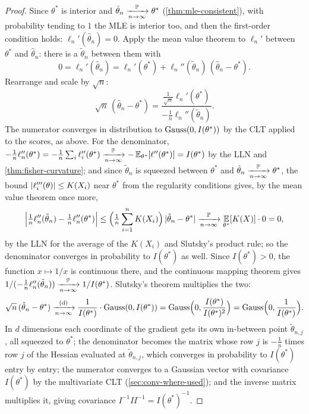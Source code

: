 \begin{proof}
Since $\theta^*$ is interior and $\hat{\theta}_n \xrightarrow [n \to \infty ]{\mathbb{P}} \theta^*$ (\cref{thm:mle-consistent}), with probability tending to $1$ the MLE is interior too, and then the first-order condition holds: $\ell_n'(\hat{\theta}_n) = 0$.
Apply the mean value theorem to $\ell_n'$ between $\theta^*$ and $\hat{\theta}_n$: there is a $\tilde{\theta}_n$ between them with
\[
0 = \ell_n'(\hat{\theta}_n) = \ell_n'(\theta^*) + \ell_n''(\tilde{\theta}_n)\,(\hat{\theta}_n - \theta^*).
\]
Rearrange and scale by $\sqrt{n}$:
\[
\sqrt{n}\,(\hat{\theta}_n - \theta^*) = \frac{\frac{1}{\sqrt{n}}\ell_n'(\theta^*)}{-\frac1n\ell_n''(\tilde{\theta}_n)}.
\]
The numerator converges in distribution to $\text{Gauss}(0, I(\theta^*))$ by the CLT applied to the scores, as above.
For the denominator, $-\frac1n\ell_n''(\theta^*) = -\frac1n\sum_i\ell_i''(\theta^*) \xrightarrow [n \to \infty ]{\mathbb{P}} -\operatorname*{\mathbb{E}}_{\theta^*}[\ell''(\theta^*)] = I(\theta^*)$ by the LLN and \cref{thm:fisher-curvature}; and since $\tilde{\theta}_n$ is squeezed between $\theta^*$ and $\hat{\theta}_n \xrightarrow [n \to \infty ]{\mathbb{P}} \theta^*$, the bound $\lvert\ell_i'''(\theta)\rvert \leq K(X_i)$ near $\theta^*$ from the regularity conditions gives, by the mean value theorem once more,
\[
\Big|\tfrac1n\ell_n''(\tilde{\theta}_n) - \tfrac1n\ell_n''(\theta^*)\Big| \leq \Big(\tfrac1n\sum_{i=1}^n K(X_i)\Big)\,\lvert\hat{\theta}_n - \theta^*\rvert \xrightarrow [n \to \infty ]{\mathbb{P}} \operatorname*{\mathbb{E}}_{\theta^*}[K(X)] \cdot 0 = 0,
\]
by the LLN for the average of the $K(X_i)$ and Slutsky's product rule; so the denominator converges in probability to $I(\theta^*)$ as well.
Since $I(\theta^*) > 0$, the function $x \mapsto 1/x$ is continuous there, and the continuous mapping theorem gives $1/(-\frac1n\ell_n''(\tilde{\theta}_n)) \xrightarrow [n \to \infty ]{\mathbb{P}} 1/I(\theta^*)$.
Slutsky's theorem multiplies the two:
\[
\sqrt{n}\,(\hat{\theta}_n - \theta^*) \xrightarrow [n \to \infty ]{\text{(d)}} \frac{1}{I(\theta^*)}\cdot\text{Gauss}(0, I(\theta^*)) = \text{Gauss}\Big(0, \frac{I(\theta^*)}{I(\theta^*)^2}\Big) = \text{Gauss}\Big(0, \frac{1}{I(\theta^*)}\Big).
\]
In $d$ dimensions  each coordinate of the gradient gets its own in-between point $\tilde{\theta}_{n,j}$, all squeezed to $\theta^*$; the denominator becomes the matrix whose row $j$ is $-\frac1n$ times row $j$ of the Hessian evaluated at $\tilde{\theta}_{n,j}$, which converges in probability to $I(\theta^*)$ entry by entry; the numerator converges to a Gaussian vector with covariance $I(\theta^*)$ by the multivariate CLT (\cref{sec:conv-where-used}); and the inverse matrix multiplies it, giving covariance $I^{-1} I I^{-1} = I(\theta^*)^{-1}$.
\end{proof}

